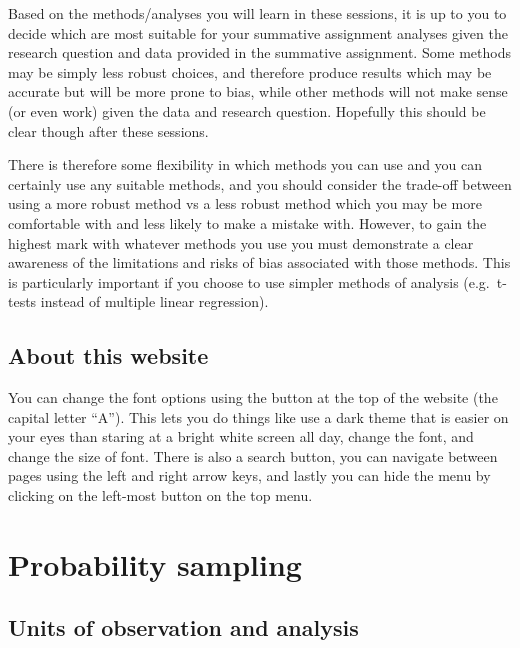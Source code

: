 \documentclass[
]{book}
\begin{document}
Based on the methods/analyses you will learn in these sessions, it is up to you to decide which are most suitable for your summative assignment analyses given the research question and data provided in the summative assignment. Some methods may be simply less robust choices, and therefore produce results which may be accurate but will be more prone to bias, while other methods will not make sense (or even work) given the data and research question. Hopefully this should be clear though after these sessions.

There is therefore some flexibility in which methods you can use and you can certainly use any suitable methods, and you should consider the trade-off between using a more robust method vs a less robust method which you may be more comfortable with and less likely to make a mistake with. However, to gain the highest mark with whatever methods you use you must demonstrate a clear awareness of the limitations and risks of bias associated with those methods. This is particularly important if you choose to use simpler methods of analysis (e.g.~t-tests instead of multiple linear regression).

\hypertarget{about-this-website}{%
\section{About this website}\label{about-this-website}}

You can change the font options using the button at the top of the website (the capital letter ``A''). This lets you do things like use a dark theme that is easier on your eyes than staring at a bright white screen all day, change the font, and change the size of font. There is also a search button, you can navigate between pages using the left and right arrow keys, and lastly you can hide the menu by clicking on the left-most button on the top menu.

\hypertarget{probability-sampling}{%
\chapter{Probability sampling}\label{probability-sampling}}

\hypertarget{units-of-observation-and-analysis}{%
\section{Units of observation and analysis}\label{units-of-observation-and-analysis}}
\end{document}

